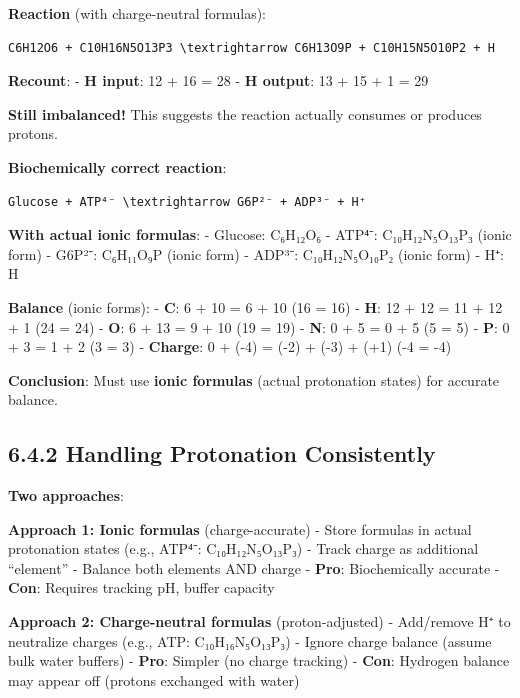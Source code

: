 \textbf{Reaction} (with charge-neutral formulas):

\begin{lstlisting}
C6H12O6 + C10H16N5O13P3 \textrightarrow C6H13O9P + C10H15N5O10P2 + H
\end{lstlisting}

\textbf{Recount}: - \textbf{H input}: 12 + 16 = 28 - \textbf{H output}:
13 + 15 + 1 = 29

\textbf{Still imbalanced!} This suggests the reaction actually consumes
or produces protons.

\textbf{Biochemically correct reaction}:

\begin{lstlisting}
Glucose + ATP⁴⁻ \textrightarrow G6P²⁻ + ADP³⁻ + H⁺
\end{lstlisting}

\textbf{With actual ionic formulas}: - Glucose: C₆H₁₂O₆ - ATP⁴⁻:
C₁₀H₁₂N₅O₁₃P₃ (ionic form) - G6P²⁻: C₆H₁₁O₉P (ionic form) - ADP³⁻:
C₁₀H₁₂N₅O₁₀P₂ (ionic form) - H⁺: H

\textbf{Balance} (ionic forms): - \textbf{C}: 6 + 10 = 6 + 10 \checkmark (16 =
16) - \textbf{H}: 12 + 12 = 11 + 12 + 1 \checkmark (24 = 24) - \textbf{O}: 6 + 13
= 9 + 10 \checkmark (19 = 19) - \textbf{N}: 0 + 5 = 0 + 5 \checkmark (5 = 5) - \textbf{P}:
0 + 3 = 1 + 2 \checkmark (3 = 3) - \textbf{Charge}: 0 + (-4) = (-2) + (-3) + (+1)
\checkmark (-4 = -4)

\textbf{Conclusion}: Must use \textbf{ionic formulas} (actual
protonation states) for accurate balance.

\hypertarget{handling-protonation-consistently}{%
\subsection{6.4.2 Handling Protonation
Consistently}\label{handling-protonation-consistently}}

\textbf{Two approaches}:

\textbf{Approach 1: Ionic formulas} (charge-accurate) - Store formulas
in actual protonation states (e.g., ATP⁴⁻: C₁₀H₁₂N₅O₁₃P₃) - Track charge
as additional ``element'' - Balance both elements AND charge -
\textbf{Pro}: Biochemically accurate - \textbf{Con}: Requires tracking
pH, buffer capacity

\textbf{Approach 2: Charge-neutral formulas} (proton-adjusted) -
Add/remove H⁺ to neutralize charges (e.g., ATP: C₁₀H₁₆N₅O₁₃P₃) - Ignore
charge balance (assume bulk water buffers) - \textbf{Pro}: Simpler (no
charge tracking) - \textbf{Con}: Hydrogen balance may appear off
(protons exchanged with water)

